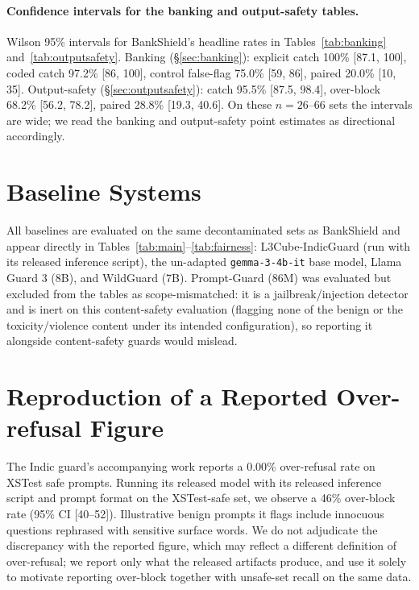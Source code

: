 \documentclass[11pt]{article}
\begin{document}
\paragraph{Confidence intervals for the banking and output-safety tables.}
\label{app:ci-extra}
Wilson 95\% intervals for BankShield's headline rates in Tables~\ref{tab:banking} and~\ref{tab:outputsafety}. Banking (\S\ref{sec:banking}): explicit catch 100\% [87.1, 100], coded catch 97.2\% [86, 100], control false-flag 75.0\% [59, 86], paired 20.0\% [10, 35]. Output-safety (\S\ref{sec:outputsafety}): catch 95.5\% [87.5, 98.4], over-block 68.2\% [56.2, 78.2], paired 28.8\% [19.3, 40.6]. On these $n{=}26$--$66$ sets the intervals are wide; we read the banking and output-safety point estimates as directional accordingly.

\section{Baseline Systems}
\label{app:baselines}

All baselines are evaluated on the same decontaminated sets as BankShield and appear directly in Tables~\ref{tab:main}--\ref{tab:fairness}: L3Cube-IndicGuard (run with its released inference script), the un-adapted \texttt{gemma-3-4b-it} base model, Llama Guard 3 (8B), and WildGuard (7B). Prompt-Guard (86M) was evaluated but excluded from the tables as scope-mismatched: it is a jailbreak/injection detector and is inert on this content-safety evaluation (flagging none of the benign or the toxicity/violence content under its intended configuration), so reporting it alongside content-safety guards would mislead.

\section{Reproduction of a Reported Over-refusal Figure}
\label{app:repro}

The Indic guard's accompanying work \citep{bramhecha2026} reports a 0.00\% over-refusal rate on XSTest safe prompts. Running its released model with its released inference script and prompt format on the XSTest-safe set, we observe a 46\% over-block rate (95\% CI [40--52]). Illustrative benign prompts it flags include innocuous questions rephrased with sensitive surface words. We do not adjudicate the discrepancy with the reported figure, which may reflect a different definition of over-refusal; we report only what the released artifacts produce, and use it solely to motivate reporting over-block together with unsafe-set recall on the same data.
\end{document}

